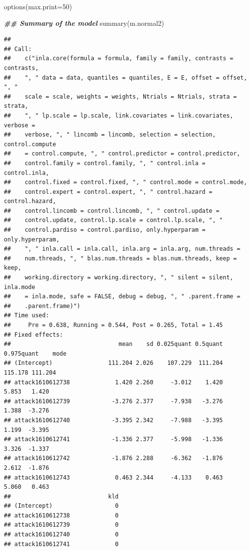 \documentclass[
]{article}
\newenvironment{Shaded}{\begin{snugshade}}{\end{snugshade}}
\newcommand{\AttributeTok}[1]{\textcolor[rgb]{0.77,0.63,0.00}{#1}}
\newcommand{\DecValTok}[1]{\textcolor[rgb]{0.00,0.00,0.81}{#1}}
\newcommand{\DocumentationTok}[1]{\textcolor[rgb]{0.56,0.35,0.01}{\textbf{\textit{#1}}}}
\newcommand{\FunctionTok}[1]{\textcolor[rgb]{0.00,0.00,0.00}{#1}}
\newcommand{\NormalTok}[1]{#1}
\begin{document}
\begin{Shaded}
\begin{Highlighting}[]
\FunctionTok{options}\NormalTok{(}\AttributeTok{max.print=}\DecValTok{50}\NormalTok{)}

\DocumentationTok{\#\# Summary of the model}
\FunctionTok{summary}\NormalTok{(m.normal2)}
\end{Highlighting}
\end{Shaded}

\begin{verbatim}
## 
## Call:
##    c("inla.core(formula = formula, family = family, contrasts = contrasts, 
##    ", " data = data, quantiles = quantiles, E = E, offset = offset, ", " 
##    scale = scale, weights = weights, Ntrials = Ntrials, strata = strata, 
##    ", " lp.scale = lp.scale, link.covariates = link.covariates, verbose = 
##    verbose, ", " lincomb = lincomb, selection = selection, control.compute 
##    = control.compute, ", " control.predictor = control.predictor, 
##    control.family = control.family, ", " control.inla = control.inla, 
##    control.fixed = control.fixed, ", " control.mode = control.mode, 
##    control.expert = control.expert, ", " control.hazard = control.hazard, 
##    control.lincomb = control.lincomb, ", " control.update = 
##    control.update, control.lp.scale = control.lp.scale, ", " 
##    control.pardiso = control.pardiso, only.hyperparam = only.hyperparam, 
##    ", " inla.call = inla.call, inla.arg = inla.arg, num.threads = 
##    num.threads, ", " blas.num.threads = blas.num.threads, keep = keep, 
##    working.directory = working.directory, ", " silent = silent, inla.mode 
##    = inla.mode, safe = FALSE, debug = debug, ", " .parent.frame = 
##    .parent.frame)") 
## Time used:
##     Pre = 0.638, Running = 0.544, Post = 0.265, Total = 1.45 
## Fixed effects:
##                               mean    sd 0.025quant 0.5quant 0.975quant    mode
## (Intercept)                111.204 2.026    107.229  111.204    115.178 111.204
## attack1610612738             1.420 2.260     -3.012    1.420      5.853   1.420
## attack1610612739            -3.276 2.377     -7.938   -3.276      1.388  -3.276
## attack1610612740            -3.395 2.342     -7.988   -3.395      1.199  -3.395
## attack1610612741            -1.336 2.377     -5.998   -1.336      3.326  -1.337
## attack1610612742            -1.876 2.288     -6.362   -1.876      2.612  -1.876
## attack1610612743             0.463 2.344     -4.133    0.463      5.060   0.463
##                            kld
## (Intercept)                  0
## attack1610612738             0
## attack1610612739             0
## attack1610612740             0
## attack1610612741             0

\end{verbatim}
\end{document}
